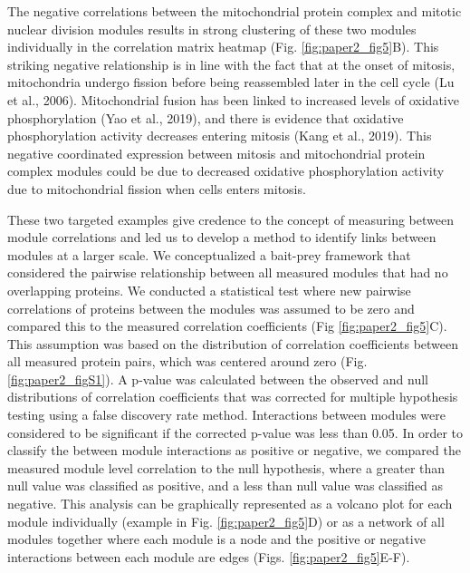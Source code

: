 The negative correlations between the mitochondrial protein complex and mitotic nuclear division modules results in strong clustering of these two modules individually in the correlation matrix heatmap (Fig. \ref{fig:paper2_fig5}B). This striking negative relationship is in line with the fact that at the onset of mitosis, mitochondria undergo fission before being reassembled later in the cell cycle (Lu et al., 2006). Mitochondrial fusion has been linked to increased levels of oxidative phosphorylation (Yao et al., 2019), and there is evidence that oxidative phosphorylation activity decreases entering mitosis (Kang et al., 2019). This negative coordinated expression between mitosis and mitochondrial protein complex modules could be due to decreased oxidative phosphorylation activity due to mitochondrial fission when cells enters mitosis.

These two targeted examples give credence to the concept of measuring between module correlations and led us to develop a method to identify links between modules at a larger scale. We conceptualized a bait-prey framework that considered the pairwise relationship between all measured modules that had no overlapping proteins. We conducted a statistical test where new pairwise correlations of proteins between the modules was assumed to be zero and compared this to the measured correlation coefficients (Fig \ref{fig:paper2_fig5}C). This assumption was based on the distribution of correlation coefficients between all measured protein pairs, which was centered around zero (Fig. \ref{fig:paper2_figS1}). A p-value was calculated between the observed and null distributions of correlation coefficients that was corrected for multiple hypothesis testing using a false discovery rate method. Interactions between modules were considered to be significant if the corrected p-value was less than 0.05. In order to classify the between module interactions as positive or negative, we compared the measured module level correlation to the null hypothesis, where a greater than null value was classified as positive, and a less than null value was classified as negative. This analysis can be graphically represented as a volcano plot for each module individually (example in Fig. \ref{fig:paper2_fig5}D) or as a network of all modules together where each module is a node and the positive or negative interactions between each module are edges (Figs. \ref{fig:paper2_fig5}E-F).

